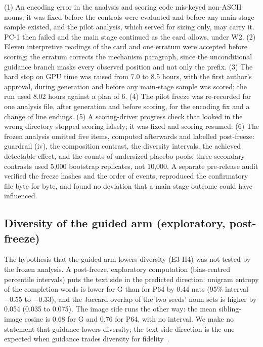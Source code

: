 \documentclass[acmsmall,screen]{acmart}
\begin{document}
(1) An encoding error in the analysis and scoring code mis-keyed non-ASCII nouns; it was fixed before the controls were evaluated and before any main-stage sample existed, and the pilot analysis, which served for sizing only, may carry it. PC-1 then failed and the main stage continued as the card allows, under W2. (2) Eleven interpretive readings of the card and one erratum were accepted before scoring; the erratum corrects the mechanism paragraph, since the unconditional guidance branch masks every observed position and not only the prefix. (3) The hard stop on GPU time was raised from 7.0 to 8.5 hours, with the first author's approval, during generation and before any main-stage sample was scored; the run used 8.02 hours against a plan of 6. (4) The pilot freeze was re-recorded for one analysis file, after generation and before scoring, for the encoding fix and a change of line endings. (5) A scoring-driver progress check that looked in the wrong directory stopped scoring falsely; it was fixed and scoring resumed. (6) The frozen analysis omitted five items, computed afterwards and labelled post-freeze: guardrail (iv), the composition contrast, the diversity intervals, the achieved detectable effect, and the counts of undersized placebo pools; three secondary contrasts used 5,000 bootstrap replicates, not 10,000. A separate pre-release audit verified the freeze hashes and the order of events, reproduced the confirmatory file byte for byte, and found no deviation that a main-stage outcome could have influenced. %

\subsection{Diversity of the guided arm (exploratory, post-freeze)}
\label{sec:s-exp003-div}

The hypothesis that the guided arm lowers diversity (E3-H4) was not tested by the frozen analysis. A post-freeze, exploratory computation (bias-centred percentile intervals) puts the text side in the predicted direction: unigram entropy of the completion words is lower for G than for P64 by 0.44 nats (95\% interval $-0.55$ to $-0.33$), and the Jaccard overlap of the two seeds' noun sets is higher by 0.054 (0.035 to 0.075). The image side runs the other way: the mean sibling-image cosine is 0.68 for G and 0.76 for P64, with no interval. We make no statement that guidance lowers diversity; the text-side direction is the one expected when guidance trades diversity for fidelity~\cite{arXiv:2207.12598}. %
\end{document}
